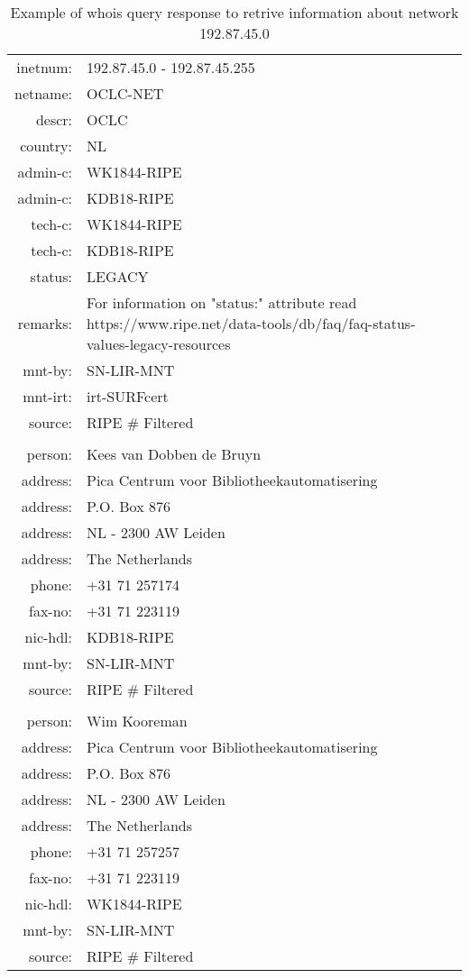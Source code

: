 \documentclass[11pt]{report}
\begin{document}
\begin{table}[h!]
\centering
\begin{tabular}{  r  l  }
 
 inetnum:  & 	192.87.45.0 - 192.87.45.255 \\
 netname:  & 	OCLC-NET \\
 descr:    &	OCLC \\
 country:  & 	NL \\
 admin-c:  & 	WK1844-RIPE \\
 admin-c:  & 	KDB18-RIPE \\
 tech-c:   & 	WK1844-RIPE \\
 tech-c:   & 	KDB18-RIPE \\
 status:   & 	LEGACY \\
 remarks:  & 	For information on "status:" attribute read https://www.ripe.net/data-tools/db/faq/faq-status-values-legacy-resources \\
 mnt-by:   & 	SN-LIR-MNT \\
 mnt-irt:  & 	irt-SURFcert \\
 source:   & 	RIPE \# Filtered \\
 \\
 person:   & 	Kees van Dobben de Bruyn \\
 address:  & 	Pica Centrum voor Bibliotheekautomatisering \\
 address:  & 	P.O. Box 876 \\
 address:  & 	NL - 2300 AW Leiden \\
 address:  & 	The Netherlands \\
 phone:    & 	+31 71 257174 \\
 fax-no:   & 	+31 71 223119 \\
 nic-hdl:  & 	KDB18-RIPE \\
 mnt-by:   &  	SN-LIR-MNT   \\
 source:   & 	RIPE \# Filtered \\
 \\
 person:   &    Wim Kooreman\\
 address:  &    Pica Centrum voor Bibliotheekautomatisering\\
 address:  &    P.O. Box 876\\
 address:  &    NL - 2300 AW Leiden\\
 address:  &    The Netherlands\\
 phone:    &    +31 71 257257\\
 fax-no:   &    +31 71 223119\\
 nic-hdl:  &    WK1844-RIPE\\
 mnt-by:   &    SN-LIR-MNT\\
 source:   &    RIPE \# Filtered\\
 
\end{tabular}
\caption{Example of whois query response to retrive information about network 192.87.45.0}
\label{table:2}
\end{table}     
        
\end{document}
